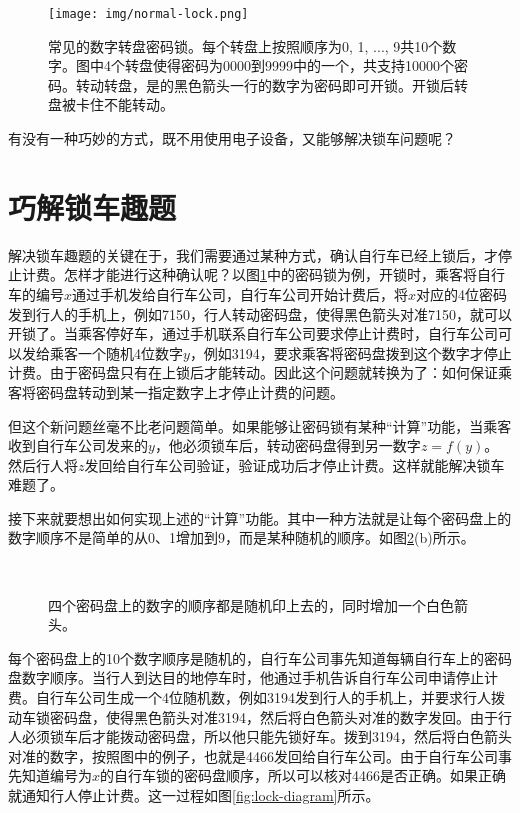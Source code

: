 \documentclass[UTF8]{article}
\begin{document}
\begin{figure}[htbp]
  \centering
  \texttt{[image: img/normal-lock.png]}
  \caption{常见的数字转盘密码锁。每个转盘上按照顺序为0, 1, ..., 9共10个数字。图中4个转盘使得密码为0000到9999中的一个，共支持10000个密码。转动转盘，是的黑色箭头一行的数字为密码即可开锁。开锁后转盘被卡住不能转动。}
  \label{fig:normal-lock}
\end{figure}


有没有一种巧妙的方式，既不用使用电子设备，又能够解决锁车问题呢？

\section{巧解锁车趣题}

解决锁车趣题的关键在于，我们需要通过某种方式，确认自行车已经上锁后，才停止计费。怎样才能进行这种确认呢？以图\cref{fig:normal-lock}中的密码锁为例，开锁时，乘客将自行车的编号$x$通过手机发给自行车公司，自行车公司开始计费后，将$x$对应的4位密码发到行人的手机上，例如7150，行人转动密码盘，使得黑色箭头对准7150，就可以开锁了。当乘客停好车，通过手机联系自行车公司要求停止计费时，自行车公司可以发给乘客一个随机4位数字$y$，例如3194，要求乘客将密码盘拨到这个数字才停止计费。由于密码盘只有在上锁后才能转动。因此这个问题就转换为了：如何保证乘客将密码盘转动到某一指定数字上才停止计费的问题。

但这个新问题丝毫不比老问题简单。如果能够让密码锁有某种“计算”功能，当乘客收到自行车公司发来的$y$，他必须锁车后，转动密码盘得到另一数字$z=f(y)$。然后行人将$z$发回给自行车公司验证，验证成功后才停止计费。这样就能解决锁车难题了。

接下来就要想出如何实现上述的“计算”功能。其中一种方法就是让每个密码盘上的数字顺序不是简单的从0、1增加到9，而是某种随机的顺序。如图\cref{fig:random-lock}(b)所示。

\begin{figure}[htbp]
  \centering
   \\
  \caption{四个密码盘上的数字的顺序都是随机印上去的，同时增加一个白色箭头。}
  \label{fig:random-lock}
\end{figure}

每个密码盘上的10个数字顺序是随机的，自行车公司事先知道每辆自行车上的密码盘数字顺序。当行人到达目的地停车时，他通过手机告诉自行车公司申请停止计费。自行车公司生成一个4位随机数，例如3194发到行人的手机上，并要求行人拨动车锁密码盘，使得黑色箭头对准3194，然后将白色箭头对准的数字发回。由于行人必须锁车后才能拨动密码盘，所以他只能先锁好车。拨到3194，然后将白色箭头对准的数字，按照图中的例子，也就是4466发回给自行车公司。由于自行车公司事先知道编号为$x$的自行车锁的密码盘顺序，所以可以核对4466是否正确。如果正确就通知行人停止计费。这一过程如图\cref{fig:lock-diagram}所示。
\end{document}
